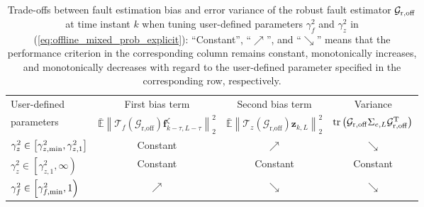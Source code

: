 \documentclass[twocolumn]{autart}
\begin{document}
\begin{table*}[!t]
 \caption{Trade-offs between fault estimation bias and error variance of the robust fault estimator $\mathcal{G}_{\rm{r,off}}$ at time instant $k$ when tuning user-defined parameters $\gamma_f^2$ and $\gamma_z^2$ in (\ref{eq:offline_mixed_prob_explicit}): ``Constant'', ``$\nearrow$'', and ``$\searrow$'' means that the performance criterion in the corresponding column remains constant, monotonically increases, and monotonically decreases with regard to the user-defined parameter specified in the corresponding row, respectively.}
 \label{tab:perf_tradeoff}
 \centering
 \begin{tabular}{lccc}
  \toprule
   User-defined & First bias term & Second bias term & Variance \\
   parameters & $\mathbb{\bar E} \left\|  {\mathcal{T}}_{f} \left( \mathcal{G}_{\text{r,off}} \right) 
   	\mathbf{f}_{k-\tau, L-\tau}^\zeta \right\|_2^2 $
   & $\mathbb{\bar E} \left\|  {\mathcal{T}}_{z} \left( \mathcal{G}_{\text{r,off}} \right) 
   	\mathbf{z}_{k, L} \right\|_2^2 $
   & $\mathrm{tr} \left( \mathcal{G}_{\rm{r,off}} \Sigma_{e,L} \mathcal{G}_{\rm{r,off}}^\mathrm{T} \right)$\\
  \midrule
  $\gamma_z^2 \in \left[ \gamma_{z,\rm{min}}^2, \gamma_{z,1}^2 \right]$ & Constant & $\nearrow$ & $\searrow$ \\
  $\gamma_z^2 \in \left[ \gamma_{z,1}^2, \infty \right)$ & Constant & Constant & Constant \\
  $\gamma_f^2 \in \left[ \gamma_{f,\rm{min}}^2, 1 \right)$ & $\nearrow$ & $\searrow$ & $\searrow$ \\
  \bottomrule
 \end{tabular}
\end{table*}
\end{document}
